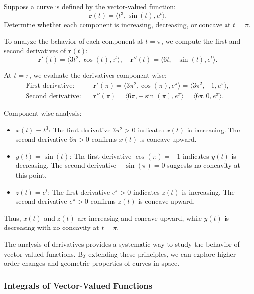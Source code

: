 \exampleline
\begin{example}
Suppose a curve is defined by the vector-valued function:
\[
\mathbf{r}(t) = \langle t^3, \sin(t), e^t \rangle.
\]
Determine whether each component is increasing, decreasing, or concave at \( t = \pi \).
\begin{solution}
To analyze the behavior of each component at \( t = \pi \), we compute the first and second derivatives of \( \mathbf{r}(t) \):
\[
\mathbf{r}'(t) = \langle 3t^2, \cos(t), e^t \rangle, \quad \mathbf{r}''(t) = \langle 6t, -\sin(t), e^t \rangle.
\]

\noindent At \( t = \pi \), we evaluate the derivatives component-wise:
\begin{align*}
    \text{First derivative:} & \quad \mathbf{r}'(\pi) = \langle 3\pi^2, \cos(\pi), e^\pi \rangle = \langle 3\pi^2, -1, e^\pi \rangle, \\
    \text{Second derivative:} & \quad \mathbf{r}''(\pi) = \langle 6\pi, -\sin(\pi), e^\pi \rangle = \langle 6\pi, 0, e^\pi \rangle.
\end{align*}

\noindent Component-wise analysis:
\begin{itemize}
    \item \( x(t) = t^3 \): The first derivative \( 3\pi^2 > 0 \) indicates \( x(t) \) is increasing. The second derivative \( 6\pi > 0 \) confirms \( x(t) \) is concave upward.
    \item \( y(t) = \sin(t) \): The first derivative \( \cos(\pi) = -1 \) indicates \( y(t) \) is decreasing. The second derivative \( -\sin(\pi) = 0 \) suggests no concavity at this point.
    \item \( z(t) = e^t \): The first derivative \( e^\pi > 0 \) indicates \( z(t) \) is increasing. The second derivative \( e^\pi > 0 \) confirms \( z(t) \) is concave upward.
\end{itemize}

\noindent Thus, \( x(t) \) and \( z(t) \) are increasing and concave upward, while \( y(t) \) is decreasing with no concavity at \( t = \pi \).
\end{solution}
\end{example}
\exampleline

\noindent The analysis of derivatives provides a systematic way to study the behavior of vector-valued functions. By extending these principles, we can explore higher-order changes and geometric properties of curves in space.


\subsubsection*{Integrals of Vector-Valued Functions}


